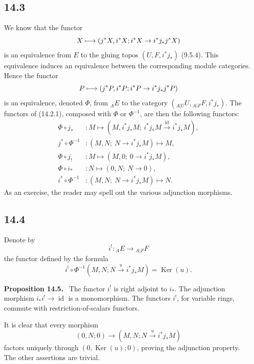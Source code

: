 \documentclass[11pt]{article}
\newcommand{\id}{\operatorname{id}}
\newcommand{\Ker}{\operatorname{Ker}}
\newenvironment{statement}[1]{\par\medskip\noindent\textbf{#1.}\ }{\par\medskip}
\begin{document}
\subsection*{14.3}
We know that the functor
\[
X\longmapsto (j^*X,i^*X;\\ i^*X\to i^*j_*j^*X)
\]
is an equivalence from $E$ to the gluing topos $(U,F,i^*j_*)$ (9.5.4). This equivalence induces an equivalence between the corresponding module categories. Hence the functor
\[
P\longmapsto (j^*P,i^*P;\\ i^*P\to i^*j_*j^*P)
\]
is an equivalence, denoted $\Phi$, from ${}_AE$ to the category $({}_{A|U}U,{}_{A|F}F,i^*j_*)$. The functors of (14.2.1), composed with $\Phi$ or $\Phi^{-1}$, are then the following functors:
\begin{align*}
\Phi\circ j_* &: M\longmapsto (M,i^*j_*M;\ i^*j_*M\xrightarrow{\id}i^*j_*M),\\
j^*\circ\Phi^{-1} &: (M,N;\ N\to i^*j_*M)\longmapsto M,\\
\Phi\circ j_! &: M\longmapsto (M,0;\ 0\to i^*j_*M),\\
\Phi\circ i_* &: N\longmapsto (0,N;\ N\to 0),\\
i^*\circ\Phi^{-1} &: (M,N;\ N\to i^*j_*M)\longmapsto N.
\end{align*}
As an exercise, the reader may spell out the various adjunction morphisms.

\subsection*{14.4}
Denote by
\begin{equation}
i^!:{}_AE\longrightarrow {}_{A|F}F\tag{14.4.1}
\end{equation}
the functor defined by the formula
\begin{equation}
i^!\circ\Phi^{-1}(M,N;N\xrightarrow{u}i^*j_*M)=\Ker(u).\tag{14.4.2}
\end{equation}

\begin{statement}{Proposition 14.5}
The functor $i^!$ is right adjoint to $i_*$. The adjunction morphism $i_*i^!\to\id$ is a monomorphism. The functors $i^!$, for variable rings, commute with restriction-of-scalars functors.
\end{statement}

It is clear that every morphism
\[
(0,N;0)\longrightarrow (M,N;N\xrightarrow{u}i^*j_*M)
\]
factors uniquely through $(0,\Ker(u);0)$, proving the adjunction property. The other assertions are trivial.
\end{document}
